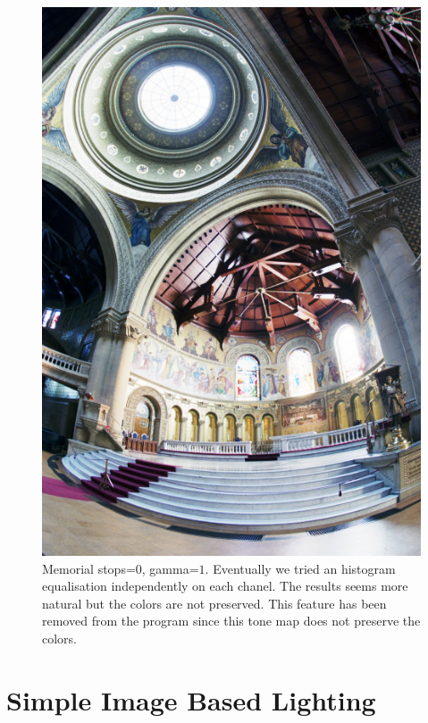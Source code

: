 \documentclass[a4paper,12pt,oneside,final]{report}
\begin{document}
\begin{figure}[!h]
\centering
\includegraphics[scale=0.7]{pictures/dummy.png}
\caption{Memorial stops=$0$, gamma=$1$. Eventually we tried an histogram equalisation independently on each chanel. The results seems more natural but the colors are not preserved. This feature has been removed from the program since this tone map does not preserve the colors.}
\end{figure}

\chapter{Simple Image Based Lighting}
\end{document}
